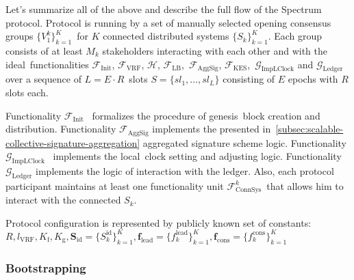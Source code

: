 Let's summarize all of the above and describe the full flow of the Spectrum protocol.
Protocol is running by a set of manually selected opening consensus groups $\{V^k_1\}_{k=1}^K$\
for $K$ connected distributed systems $\{S_k\}_{k=1}^K$.
Each group consists of at least $M_k$ stakeholders interacting with each other and with the ideal\
functionalities $\mathcal{F}_{\text{Init}}$, ${\mathcal{F}}_{\text{VRF}}$, $\mathcal{H}$, ${\mathcal{F}}_{\text{LB}}$,\
$\mathcal{F}_{\text{AggSig}}$, ${\mathcal{F}}_{\text{KES}}$,\
$\mathcal{G}_{\text{ImpLClock}}$ and $\mathcal{G}_{\text{Ledger}}$ over a sequence of $L = E \cdot R$\
slots ${S=\{sl_1,\dots,sl_L\}}$ consisting of $E$ epochs with $R$ slots each.

Functionality ${\mathcal{F}}_{\text{Init}}$~\cite{Badertscher2018} formalizes the procedure of genesis\
block creation and distribution.
Functionality ${\mathcal{F}}_{\text{AggSig}}$ implements the presented in~\ref{subsec:scalable-collective-signature-aggregation} aggregated signature scheme logic.
Functionality $\mathcal{G}_{\text{ImpLClock}}$~\cite{cryptoeprint:2019/838} implements the local\
clock setting and adjusting logic.
Functionality $\mathcal{G}_{\text{Ledger}}$ implements the logic of interaction with the ledger.
Also, each protocol participant maintains at least one functionality unit $\mathcal{F}^k_{\text{ConnSys}}$\
that allows him to interact with the connected $S_k$.

Protocol configuration is represented by publicly known set of constants:\
$R, l_{\text{VRF}}, K_{\text{f}}, K_{\text{g}}, \mathbf{S}_{\text{id}} = \{S_k^{\text{id}}\}_{k=1}^K, \mathbf{f}_{\text{lead}} = \{f^{\text{lead}}_k\}_{k=1}^K, \mathbf{f}_{\text{cons}} = \{f^{\text{cons}}_k\}_{k=1}^K$

\subsubsection{Bootstrapping}\label{subsubsec:bootstrapping}


